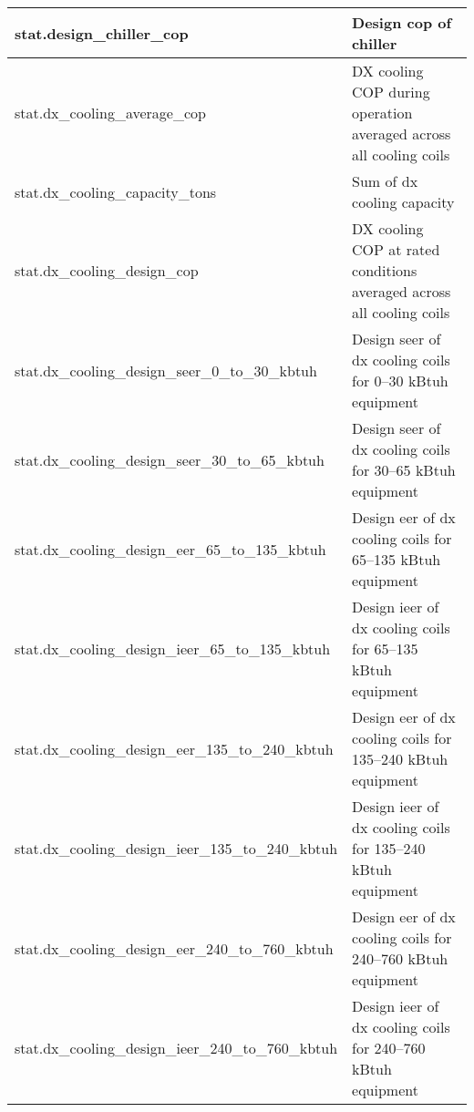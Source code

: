 \begin{center}
\begin{longtable}{|p{3in}|p{3in}|}
stat.design\_chiller\_cop                                  & Design cop of chiller                                                                                                 \\ \hline
stat.dx\_cooling\_average\_cop                             & DX cooling COP during operation averaged across all cooling coils                                                     \\ \hline
stat.dx\_cooling\_capacity\_tons                           & Sum of dx cooling capacity                                                                                            \\ \hline
stat.dx\_cooling\_design\_cop                              & DX cooling COP at rated conditions averaged across all cooling coils                                                  \\ \hline
stat.dx\_cooling\_design\_seer\_0\_to\_30\_kbtuh           & Design seer of dx cooling coils for 0--30 kBtuh equipment                                                              \\ \hline
stat.dx\_cooling\_design\_seer\_30\_to\_65\_kbtuh          & Design seer of dx cooling coils for 30--65 kBtuh equipment                                                             \\ \hline
stat.dx\_cooling\_design\_eer\_65\_to\_135\_kbtuh          & Design eer of dx cooling coils for 65--135 kBtuh equipment                                                             \\ \hline
stat.dx\_cooling\_design\_ieer\_65\_to\_135\_kbtuh         & Design ieer of dx cooling coils for 65--135 kBtuh equipment                                                            \\ \hline
stat.dx\_cooling\_design\_eer\_135\_to\_240\_kbtuh         & Design eer of dx cooling coils for 135--240 kBtuh equipment                                                            \\ \hline
stat.dx\_cooling\_design\_ieer\_135\_to\_240\_kbtuh        & Design ieer of dx cooling coils for 135--240 kBtuh equipment                                                           \\ \hline
stat.dx\_cooling\_design\_eer\_240\_to\_760\_kbtuh         & Design eer of dx cooling coils for 240--760 kBtuh equipment                                                            \\ \hline
stat.dx\_cooling\_design\_ieer\_240\_to\_760\_kbtuh        & Design ieer of dx cooling coils for 240--760 kBtuh equipment                                                           \\ \hline

\end{longtable}
\end{center}
